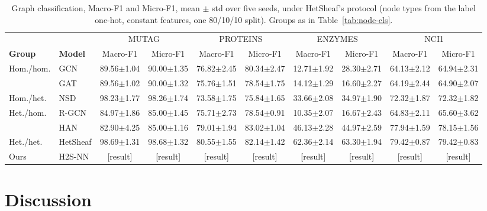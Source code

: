 \documentclass{article}
\newcommand{\method}{\textsc{H2S-NN}}
\newcommand{\res}{{\scriptsize[result]}}
\begin{document}
\begin{table}[!htbp]
  \centering
  \caption{Graph classification, Macro-F1 and Micro-F1, mean $\pm$ std over five seeds, under HetSheaf's protocol (node types from the label one-hot, constant features, one 80/10/10 split). Groups as in Table~\ref{tab:node-cls}.}
  \label{tab:graph-cls}
  \scriptsize
  \setlength{\tabcolsep}{4pt}
  \begin{tabular}{llcccccccc}
    \toprule
    & & \multicolumn{2}{c}{MUTAG} & \multicolumn{2}{c}{PROTEINS} & \multicolumn{2}{c}{ENZYMES} & \multicolumn{2}{c}{NCI1} \\
    \cmidrule(lr){3-4}\cmidrule(lr){5-6}\cmidrule(lr){7-8}\cmidrule(lr){9-10}
    \textbf{Group} & \textbf{Model} & Macro-F1 & Micro-F1 & Macro-F1 & Micro-F1 & Macro-F1 & Micro-F1 & Macro-F1 & Micro-F1 \\
    \midrule
    \multirow{2}{*}{Hom./hom.} & GCN & 89.56$\pm$1.04 & 90.00$\pm$1.35 & 76.82$\pm$2.45 & 80.34$\pm$2.47 & 12.71$\pm$1.92 & 28.30$\pm$2.71 & 64.13$\pm$2.12 & 64.94$\pm$2.31 \\
    & GAT & 89.56$\pm$1.02 & 90.00$\pm$1.32 & 75.76$\pm$1.51 & 78.54$\pm$1.75 & 14.12$\pm$1.29 & 16.60$\pm$2.27 & 64.19$\pm$2.44 & 64.90$\pm$2.07 \\
    \midrule
    Hom./het. & NSD & 98.23$\pm$1.77 & 98.26$\pm$1.74 & 73.58$\pm$1.75 & 75.84$\pm$1.65 & 33.66$\pm$2.08 & 34.97$\pm$1.90 & 72.32$\pm$1.87 & 72.32$\pm$1.82 \\
    \midrule
    \multirow{2}{*}{Het./hom.} & R-GCN & 84.97$\pm$1.86 & 85.00$\pm$1.45 & 75.71$\pm$2.73 & 78.54$\pm$0.91 & 10.35$\pm$2.07 & 16.67$\pm$2.43 & 64.83$\pm$2.11 & 65.60$\pm$3.62 \\
    & HAN & 82.90$\pm$4.25 & 85.00$\pm$1.16 & 79.01$\pm$1.94 & 83.02$\pm$1.04 & 46.13$\pm$2.28 & 44.97$\pm$2.59 & 77.94$\pm$1.59 & 78.15$\pm$1.56 \\
    \midrule
    Het./het. & HetSheaf & 98.69$\pm$1.31 & 98.68$\pm$1.32 & 80.55$\pm$1.55 & 82.14$\pm$1.42 & 62.36$\pm$2.14 & 63.30$\pm$1.94 & 79.42$\pm$0.87 & 79.42$\pm$0.83 \\
    \midrule
    Ours & \method{} & \res & \res & \res & \res & \res & \res & \res & \res \\
    \bottomrule
  \end{tabular}
\end{table}



\section{Discussion}
\label{sec:discussion}
\end{document}
